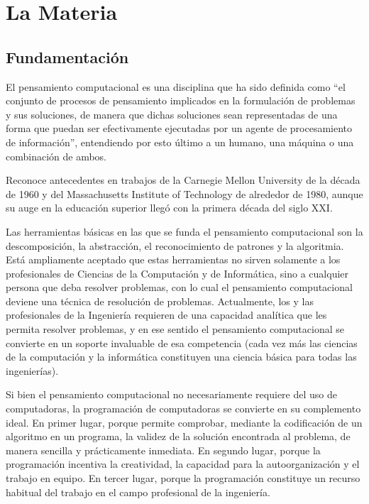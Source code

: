 \documentclass[
  letterpaper,
  DIV=11,
  numbers=noendperiod]{scrreprt}
\begin{document}
\chapter*{La Materia}\label{la-materia}


\section*{Fundamentación}\label{fundamentaciuxf3n}


El pensamiento computacional es una disciplina que ha sido definida como
``el conjunto de procesos de pensamiento implicados en la formulación de
problemas y sus soluciones, de manera que dichas soluciones sean
representadas de una forma que puedan ser efectivamente ejecutadas por
un agente de procesamiento de información'', entendiendo por esto último
a un humano, una máquina o una combinación de ambos.

Reconoce antecedentes en trabajos de la Carnegie Mellon University de la
década de 1960 y del Massachusetts Institute of Technology de alrededor
de 1980, aunque su auge en la educación superior llegó con la primera
década del siglo XXI.

Las herramientas básicas en las que se funda el pensamiento
computacional son la descomposición, la abstracción, el reconocimiento
de patrones y la algoritmia. Está ampliamente aceptado que estas
herramientas no sirven solamente a los profesionales de Ciencias de la
Computación y de Informática, sino a cualquier persona que deba resolver
problemas, con lo cual el pensamiento computacional deviene una técnica
de resolución de problemas. Actualmente, los y las profesionales de la
Ingeniería requieren de una capacidad analítica que les permita resolver
problemas, y en ese sentido el pensamiento computacional se convierte en
un soporte invaluable de esa competencia (cada vez más las ciencias de
la computación y la informática constituyen una ciencia básica para
todas las ingenierías).

Si bien el pensamiento computacional no necesariamente requiere del uso
de computadoras, la programación de computadoras se convierte en su
complemento ideal. En primer lugar, porque permite comprobar, mediante
la codificación de un algoritmo en un programa, la validez de la
solución encontrada al problema, de manera sencilla y prácticamente
inmediata. En segundo lugar, porque la programación incentiva la
creatividad, la capacidad para la autoorganización y el trabajo en
equipo. En tercer lugar, porque la programación constituye un recurso
habitual del trabajo en el campo profesional de la ingeniería.
\end{document}
